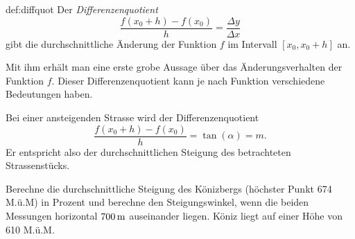 \documentclass[%
11pt,%
twoside,%
titlepage,%
german,%
headsepline%
]{scrartcl}
\begin{document}
\begin{cdef}[Differenzenquotient]{def:diffquot}
Der \emph{Differenzenquotient}
$$\frac{f(x_0+h)-f(x_0)}{h}=\frac{\Delta y}{\Delta x}$$
gibt die durchschnittliche \"Anderung der Funktion $f$ im Intervall $[x_0,x_0+h]$ an.
\end{cdef}

Mit ihm erh\"alt man eine erste grobe Aussage \"uber das \"Anderungsverhalten der Funktion $f$. Dieser Differenzenquotient kann je nach Funktion verschiedene Bedeutungen haben.

\begin{bsp}\label{bspsteigungswinkel}
Bei
einer ansteigenden Strasse wird der Differenzenquotient
$$\frac{f(x_0+h)-f(x_0)}{h}=\tan(\alpha)=m.$$
Er entspricht also der durchschnittlichen Steigung des betrachteten Strassenst\"ucks.
\end{bsp}

\begin{ueb}[Könizberg]\label{uebkoenizberg}
Berechne die durchschnittliche Steigung des K\"onizbergs (h\"ochster Punkt 674 M.\"u.M) in Prozent und berechne den Steigungswinkel, wenn die beiden Messungen horizontal $\unit[700]{m}$ auseinander liegen. K\"oniz liegt auf einer H\"ohe von 610 M.\"u.M.
\end{ueb}
\end{document}
